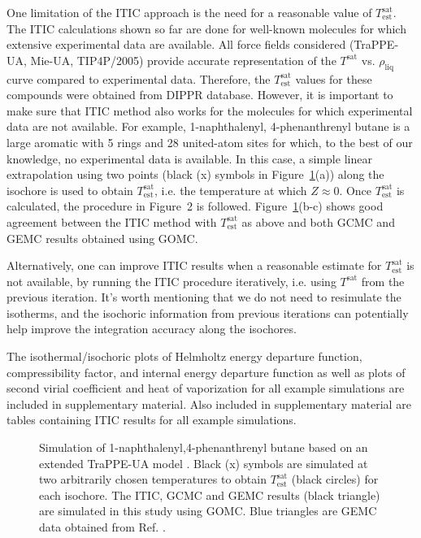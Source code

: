 \documentclass[5p,times]{elsarticle}
\begin{document}
One limitation of the ITIC approach is the need for a reasonable value of $T_\mathrm{est}^\mathrm{sat}$. The ITIC calculations shown so far are done for well-known molecules for which extensive experimental data are available. All force fields considered (TraPPE-UA, Mie-UA, TIP4P/2005) provide accurate representation of the $T^\mathrm{sat}$ vs. $\rho_\mathrm{liq}$ curve compared to experimental data. Therefore, the $T_\mathrm{est}^\mathrm{sat}$ values for these compounds were obtained from DIPPR database. However, it is important to make sure that ITIC method also works for the molecules for which experimental data are not available. For example, 1-naphthalenyl, 4-phenanthrenyl butane is a large aromatic with 5 rings and 28 united-atom sites for which, to the best of our knowledge, no experimental data is available. In this case, a simple linear extrapolation using two points (black (x) symbols in Figure~\ref{fig:Ex_Sim_TraPPE-1p4nB}(a)) along the isochore is used to obtain $T_\mathrm{est}^\mathrm{sat}$, i.e. the temperature at which $Z\approx0$. Once $T_\mathrm{est}^\mathrm{sat}$ is calculated, the procedure in Figure~2 is followed. Figure~\ref{fig:Ex_Sim_TraPPE-1p4nB}(b-c) shows good agreement between the ITIC method with $T_\mathrm{est}^\mathrm{sat}$ as above and both GCMC and GEMC results obtained using GOMC.

Alternatively, one can improve ITIC results when a reasonable estimate for $T_\mathrm{est}^\mathrm{sat}$ is not available, by running the ITIC procedure iteratively, i.e. using $T^\mathrm{sat}$ from the previous iteration. It's worth mentioning that we do not need to resimulate the isotherms, and the isochoric information from previous iterations can potentially help improve the integration accuracy along the isochores. 

The isothermal/isochoric plots of Helmholtz energy departure function, compressibility factor, and internal energy departure function as well as plots of second virial coefficient and heat of vaporization for all example simulations are included in supplementary material. Also included in supplementary material are tables containing ITIC results for all example simulations.


\begin{figure}[]
\centering
{}\label{cc}
\label{aa}
\label{bb}
\caption{
Simulation of 1-naphthalenyl,4-phenanthrenyl butane based on an extended TraPPE-UA model \cite{Yiannourakou2018}. Black (x) symbols are simulated at two arbitrarily chosen temperatures to obtain $T_\mathrm{est}^\mathrm{sat}$ (black circles) for each isochore. The ITIC, GCMC and GEMC results (black triangle) are simulated in this study using GOMC. Blue triangles are GEMC data obtained from Ref. \cite{Yiannourakou2018}.
}
\label{fig:Ex_Sim_TraPPE-1p4nB}
\end{figure}
\end{document}
